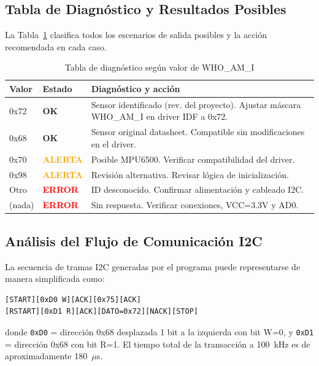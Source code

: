 \documentclass[10pt,twocolumn,a4paper]{article}
\begin{document}
\subsection{Tabla de Diagnóstico y Resultados Posibles}

La Tabla~\ref{tab:resultados} clasifica todos los escenarios de salida
posibles y la acción recomendada en cada caso.

\begin{table}[H]
\centering
\caption{Tabla de diagnóstico según valor de WHO\_AM\_I}
\label{tab:resultados}
\scriptsize
\begin{tabular}{p{0.9cm}p{1.2cm}p{3.6cm}}
\toprule
\textbf{Valor} & \textbf{Estado} & \textbf{Diagnóstico y acción} \\
\midrule
0x72 & \textcolor{green!60!black}{\bfseries OK} & Sensor identificado (rev. del proyecto). Ajustar máscara WHO\_AM\_I en driver IDF a 0x72. \\
0x68 & \textcolor{green!60!black}{\bfseries OK} & Sensor original datasheet. Compatible sin modificaciones en el driver. \\
0x70 & \textcolor{orange}{\bfseries ALERTA} & Posible MPU6500. Verificar compatibilidad del driver. \\
0x98 & \textcolor{orange}{\bfseries ALERTA} & Revisión alternativa. Revisar lógica de inicialización. \\
Otro & \textcolor{red}{\bfseries ERROR} & ID desconocido. Confirmar alimentación y cableado I2C. \\
(nada) & \textcolor{red}{\bfseries ERROR} & Sin respuesta. Verificar conexiones, VCC=3.3V y AD0. \\
\bottomrule
\end{tabular}
\end{table}

\subsection{Análisis del Flujo de Comunicación I2C}

La secuencia de tramas I2C generadas por el programa puede
representarse de manera simplificada como:

\begin{lstlisting}[style=output, numbers=none, caption={Trama I2C generada}]
[START][0xD0 W][ACK][0x75][ACK]
[RSTART][0xD1 R][ACK][DATO=0x72][NACK][STOP]
\end{lstlisting}

donde \texttt{0xD0} = dirección 0x68 desplazada 1 bit a la izquierda con bit W=0, y \texttt{0xD1} = dirección 0x68 con bit R=1. El tiempo total de la transacción a 100~kHz es de aproximadamente 180~$\mu$s.
\end{document}
